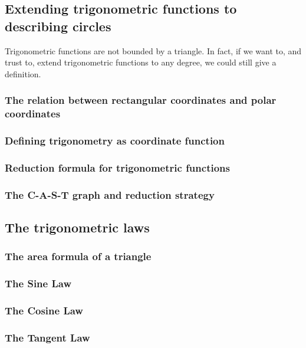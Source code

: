 \documentclass[12pt]{article}
\begin{document}
    \subsection{Extending trigonometric functions to describing circles}

    Trigonometric functions are not bounded by a triangle. In fact, if we want to, and trust to, extend trigonometric functions to any degree, we could still give a definition.

    \subsubsection{The relation between rectangular coordinates and polar coordinates}

    \subsubsection{Defining trigonometry as coordinate function}

    \subsubsection{Reduction formula for trigonometric functions}

    \subsubsection{The C-A-S-T graph and reduction strategy}

    \subsection{The trigonometric laws}

    \subsubsection{The area formula of a triangle}

    \subsubsection{The Sine Law}

    \subsubsection{The Cosine Law}

    \subsubsection{The Tangent Law}
\end{document}
